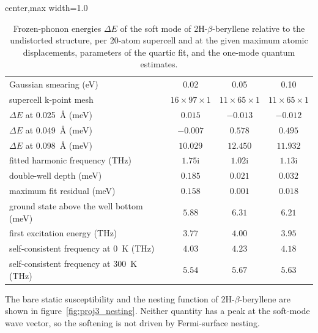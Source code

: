 \begin{table}[!htbp]
\centering
{}
\begin{adjustbox}{center,max width=1.0\linewidth}
\begin{tabular}{lccc}
\hline
\rowcolor{gray!25}
Gaussian smearing (eV) & 0.02 & 0.05 & 0.10 \\
supercell k-point mesh & $16 \times 97 \times 1$ & $11 \times 65 \times 1$ & $11 \times 65 \times 1$ \\
\hline
$\Delta E$ at \qty{0.025}{\angstrom} (meV) & $0.015$ & $-0.013$ & $-0.012$ \\
$\Delta E$ at \qty{0.049}{\angstrom} (meV) & $-0.007$ & $0.578$ & $0.495$ \\
$\Delta E$ at \qty{0.098}{\angstrom} (meV) & $10.029$ & $12.450$ & $11.932$ \\
fitted harmonic frequency (THz) & $1.75\mathrm{i}$ & $1.02\mathrm{i}$ & $1.13\mathrm{i}$ \\
double-well depth (meV) & $0.185$ & $0.021$ & $0.032$ \\
maximum fit residual (meV) & $0.158$ & $0.001$ & $0.018$ \\
\hline
ground state above the well bottom (meV) & $5.88$ & $6.31$ & $6.21$ \\
first excitation energy (THz) & $3.77$ & $4.00$ & $3.95$ \\
self-consistent frequency at \qty{0}{\kelvin} (THz) & $4.03$ & $4.23$ & $4.18$ \\
self-consistent frequency at \qty{300}{\kelvin} (THz) & $5.54$ & $5.67$ & $5.63$ \\
\hline
\end{tabular}
\end{adjustbox}
\caption{Frozen-phonon energies $\Delta E$ of the soft mode of 2H-$\beta$-beryllene relative to the undistorted structure,
per 20-atom supercell and at the given maximum atomic displacements,
parameters of the quartic fit,
and the one-mode quantum estimates.}
\label{tab:proj3_soft_mode}
\end{table}

The bare static susceptibility and the nesting function of 2H-$\beta$-beryllene are shown in figure~\ref{fig:proj3_nesting}.
Neither quantity has a peak at the soft-mode wave vector,
so the softening is not driven by Fermi-surface nesting.

